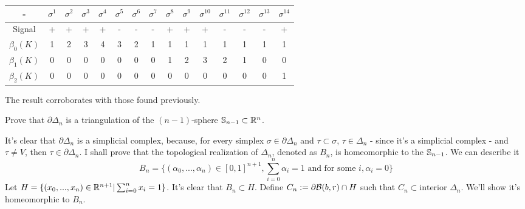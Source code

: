 \begin{enumerate}
    \begin{center}
        \begin{tabular}{ c|c|c|c|c|c|c|c|c|c|c|c|c|c|c}
         - & $\sigma^1$ & $\sigma^2$ & $\sigma^3$ & $\sigma^4$ & $\sigma^5$ &
         $\sigma^6$ & $\sigma^7$ &$\sigma^8$ &$\sigma^9$ &$\sigma^{10}$
         &$\sigma^{11}$ &$\sigma^{12}$ &$\sigma^{13}$ &$\sigma^{14}$ \\ 
         \hline
         Signal & + & + & + & + & - & - & - & + & + & + & - & - & - & + \\  
         $\beta_0(K)$ & 1 & 2 & 3 & 4 & 3 & 2 & 1 & 1 & 1 & 1 & 1 & 1 & 1 & 1\\ 
         $\beta_1(K)$ & 0 & 0 & 0 & 0 & 0 & 0 & 0 & 1 & 2 & 3 & 2 & 1 & 0 & 0 \\     
         $\beta_2(K)$ & 0 & 0 & 0 & 0 & 0 & 0 & 0 & 0 & 0 & 0 & 0 & 0 & 0 & 1\\     

        \end{tabular}
    \end{center}

\end{enumerate}

The result corroborates with those found previously. 

\noindent\linia

\begin{exercise}
    Prove that $\partial \Delta_n$ is a triangulation of the $(n -1)$-sphere
    $\mathbb{S}_{n-1} \subset \mathbb{R}^n$. 
\end{exercise}

It's clear that $\partial \Delta_n$ is a simplicial complex, because, for
every simplex $\sigma \in \partial \Delta_n$ and $\tau \subset \sigma$, $\tau
\in \Delta_n$ - since it's a simplicial complex - and $\tau \neq V$, then $\tau
\in \partial \Delta_n$. I shall prove that the topological realization of
$\Delta_n$, denoted as $B_n$, is homeomorphic to the $\mathbb{S}_{n-1}$. We can
describe it
$$
B_n = \{(\alpha_0, ..., \alpha_n) \in [0,1]^{n+1}, \sum_{i=0}^n \alpha_i = 1 \text{ and for some } i, \alpha_i = 0\}
$$
Let $H = \{(x_0, ..., x_n) \in \mathbb{R}^{n+1} | \sum_{i=0}^n x_i = 1\}$. It's clear
that $B_n \subset H$. Define $C_n := \partial \mathcal{B}(b,r) \cap H$ such that $C_n
\subset \text{interior } \Delta_n$. We'll show it's homeomorphic
to $B_n$. 

